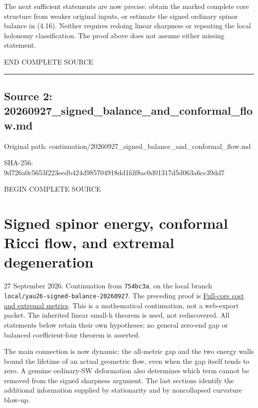 \documentclass[
  10pt,
]{article}
\begin{document}
The next sufficient statements are now precise: obtain the marked
complete core structure from weaker original inputs, or estimate the
signed ordinary spinor balance in (4.16). Neither requires redoing
linear sharpness or repeating the local holonomy classification. The
proof above does not assume either missing statement.

END COMPLETE SOURCE

\begin{center}\rule{0.5\linewidth}{0.5pt}\end{center}

\hypertarget{source-2-20260927_signed_balance_and_conformal_flow.md}{%
\subsection{Source 2:
20260927\_signed\_balance\_and\_conformal\_flow.md}\label{source-2-20260927_signed_balance_and_conformal_flow.md}}

Original path:
continuation/20260927\_signed\_balance\_and\_conformal\_flow.md

SHA-256:
9d726a0c5653f223eedb424d985704918dd1fdf8ac0d01317d5d063a6cc39dd7

BEGIN COMPLETE SOURCE

\hypertarget{signed-spinor-energy-conformal-ricci-flow-and-extremal-degeneration}{%
\section{Signed spinor energy, conformal Ricci flow, and extremal
degeneration}\label{signed-spinor-energy-conformal-ricci-flow-and-extremal-degeneration}}

27 September 2026. Continuation from \texttt{754bc3a}, on the local
branch \texttt{local/yau26-signed-balance-20260927}. The preceding proof
is \href{20260927_full_core_cost_and_extremal_metrics.md}{Full-core cost
and extremal metrics}. This is a mathematical continuation, not a
web-export packet. The inherited linear small-h theorem is used, not
rediscovered. All statements below retain their own hypotheses; no
general zero-end gap or balanced coefficient-four theorem is asserted.

The main connection is now dynamic: the all-metric gap and the two
energy walls bound the lifetime of an actual geometric flow, even when
the gap itself tends to zero. A genuine ordinary-SW deformation also
determines which term cannot be removed from the signed sharpness
argument. The last sections identify the additional information supplied
by stationarity and by noncollapsed curvature blow-up.
\end{document}
